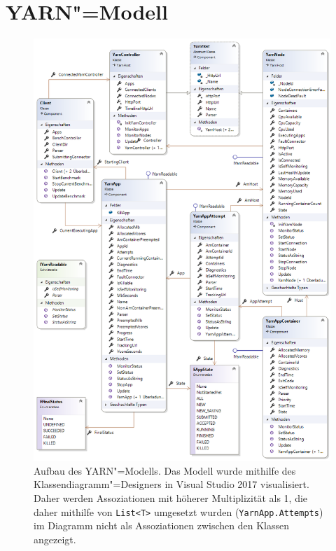 \section{YARN"=Modell}\label{sec:yarnModel}


\begin{figure}
    \includegraphics[width=\columnwidth]{./images/yarnModel.png}
    \caption[Aufbau des YARN"=Modells]
    {Aufbau des YARN"=Modells.
        Das Modell wurde mithilfe des Klassendiagramm"=Designers in Visual Studio 2017 visualisiert.
        Daher werden Assoziationen mit höherer Multiplizität als 1, die daher mithilfe von \texttt{List<T>} umgesetzt wurden (\zB \texttt{YarnApp.Attempts}) im Diagramm nicht als Assoziationen zwischen den Klassen angezeigt.}
    \label{fig:yarnModel}
\end{figure}

